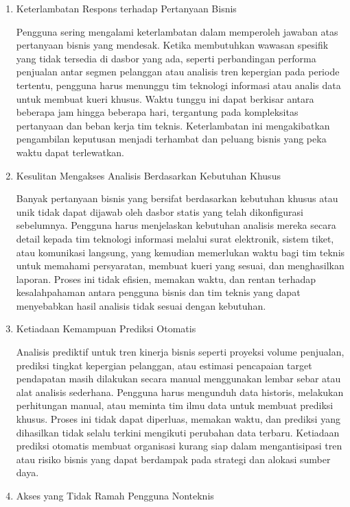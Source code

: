 \begin{enumerate}

\item Keterlambatan Respons terhadap Pertanyaan Bisnis

Pengguna sering mengalami keterlambatan dalam memperoleh jawaban atas pertanyaan bisnis yang mendesak. Ketika membutuhkan wawasan spesifik yang tidak tersedia di dasbor yang ada, seperti perbandingan performa penjualan antar segmen pelanggan atau analisis tren kepergian pada periode tertentu, pengguna harus menunggu tim teknologi informasi atau analis data untuk membuat kueri khusus. Waktu tunggu ini dapat berkisar antara beberapa jam hingga beberapa hari, tergantung pada kompleksitas pertanyaan dan beban kerja tim teknis. Keterlambatan ini mengakibatkan pengambilan keputusan menjadi terhambat dan peluang bisnis yang peka waktu dapat terlewatkan.

\item Kesulitan Mengakses Analisis Berdasarkan Kebutuhan Khusus

Banyak pertanyaan bisnis yang bersifat berdasarkan kebutuhan khusus atau unik tidak dapat dijawab oleh dasbor statis yang telah dikonfigurasi sebelumnya. Pengguna harus menjelaskan kebutuhan analisis mereka secara detail kepada tim teknologi informasi melalui surat elektronik, sistem tiket, atau komunikasi langsung, yang kemudian memerlukan waktu bagi tim teknis untuk memahami persyaratan, membuat kueri yang sesuai, dan menghasilkan laporan. Proses ini tidak efisien, memakan waktu, dan rentan terhadap kesalahpahaman antara pengguna bisnis dan tim teknis yang dapat menyebabkan hasil analisis tidak sesuai dengan kebutuhan.

\item Ketiadaan Kemampuan Prediksi Otomatis

Analisis prediktif untuk tren kinerja bisnis seperti proyeksi volume penjualan, prediksi tingkat kepergian pelanggan, atau estimasi pencapaian target pendapatan masih dilakukan secara manual menggunakan lembar sebar atau alat analisis sederhana. Pengguna harus mengunduh data historis, melakukan perhitungan manual, atau meminta tim ilmu data untuk membuat prediksi khusus. Proses ini tidak dapat diperluas, memakan waktu, dan prediksi yang dihasilkan tidak selalu terkini mengikuti perubahan data terbaru. Ketiadaan prediksi otomatis membuat organisasi kurang siap dalam mengantisipasi tren atau risiko bisnis yang dapat berdampak pada strategi dan alokasi sumber daya.

\item Akses yang Tidak Ramah Pengguna Nonteknis


\end{enumerate}
